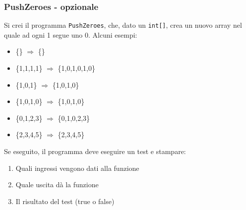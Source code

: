 \documentclass{beamer}
\begin{document}
\begin{frame}
\frametitle{PushZeroes - opzionale}
Si crei il programma \texttt{PushZeroes}, che, dato un \texttt{int[]}, crea un nuovo array nel quale ad ogni 1 segue uno 0. Alcuni esempi:
\begin{itemize}
 \item \{\} $\Rightarrow$ \{\}
 \item \{1,1,1,1\} $\Rightarrow$ \{1,0,1,0,1,0\}
 \item \{1,0,1\} $\Rightarrow$ \{1,0,1,0\}
 \item \{1,0,1,0\} $\Rightarrow$ \{1,0,1,0\}
 \item \{0,1,2,3\} $\Rightarrow$ \{0,1,0,2,3\}
 \item \{2,3,4,5\} $\Rightarrow$ \{2,3,4,5\}
\end{itemize}
Se eseguito, il programma deve eseguire un test e stampare:
\begin{enumerate}
 \item Quali ingressi vengono dati alla funzione
 \item Quale uscita dà la funzione
 \item Il risultato del test (true o false)
\end{enumerate}
\end{frame}
\end{document}
